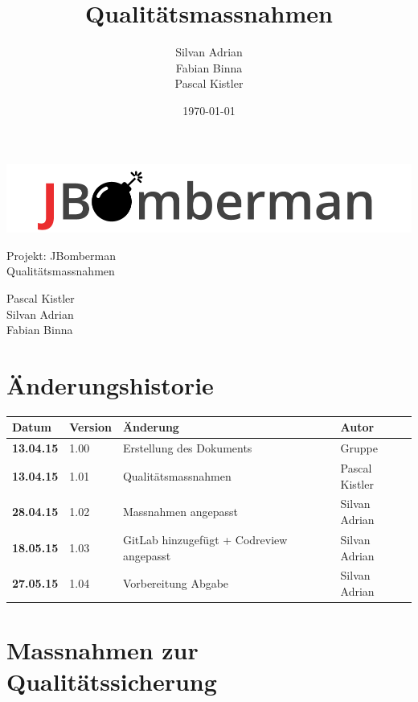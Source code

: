 \documentclass[11pt]{scrartcl}
\title{Qualitätsmassnahmen}
\author{Silvan Adrian \\ Fabian Binna \\ Pascal Kistler}
\date{\today{}}
\begin{document}
\def\arraystretch{1.5}
\begin{titlepage}
\begin{center}
\vspace{10em}
\includegraphics[scale=2]{jbomberman}
\vspace{10em}
\end{center}
\begin{center}
\huge {Projekt: JBomberman} \\
\huge {Qualitätsmassnahmen}
\end{center}
\begin{center}
\vspace{10em}
\LARGE {Pascal Kistler} \\
\LARGE {Silvan Adrian} \\
\LARGE {Fabian Binna}
\end{center}

\end{titlepage}

\newpage
\section{Änderungshistorie}
\label{sec:Änderungen}

\begin{tabularx}{\linewidth}{l l l l}
\textbf{Datum} & \textbf{Version} & \textbf{Änderung}  & \textbf{Autor} \\
\hline
\textbf{13.04.15} & 1.00 & Erstellung des Dokuments & Gruppe \\
\textbf{13.04.15} & 1.01 & Qualitätsmassnahmen & Pascal Kistler \\
\bf{28.04.15} & 1.02 & Massnahmen angepasst & Silvan Adrian\\
\bf{18.05.15} & 1.03 & GitLab hinzugefügt + Codreview angepasst & Silvan Adrian \\
\bf{27.05.15} & 1.04 & Vorbereitung Abgabe & Silvan Adrian\\
\end{tabularx}

\newpage
\tableofcontents
\newpage


\section{Massnahmen zur Qualitätssicherung}
\end{document}
